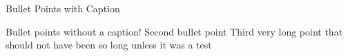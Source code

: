\begin{frame}{Bullet Points with Caption}
 \begin{fullpageitemize}
  \item {}
  \item {}
 \end{fullpageitemize}
\end{frame}

\begin{frame}{}
 \vfill
 \begin{fullpageitemize}
  \itemR Bullet points without a caption!
  \itemR Second bullet point
  \itemR Third very long point that should not have been so long unless it was a test
 \end{fullpageitemize}
\end{frame}